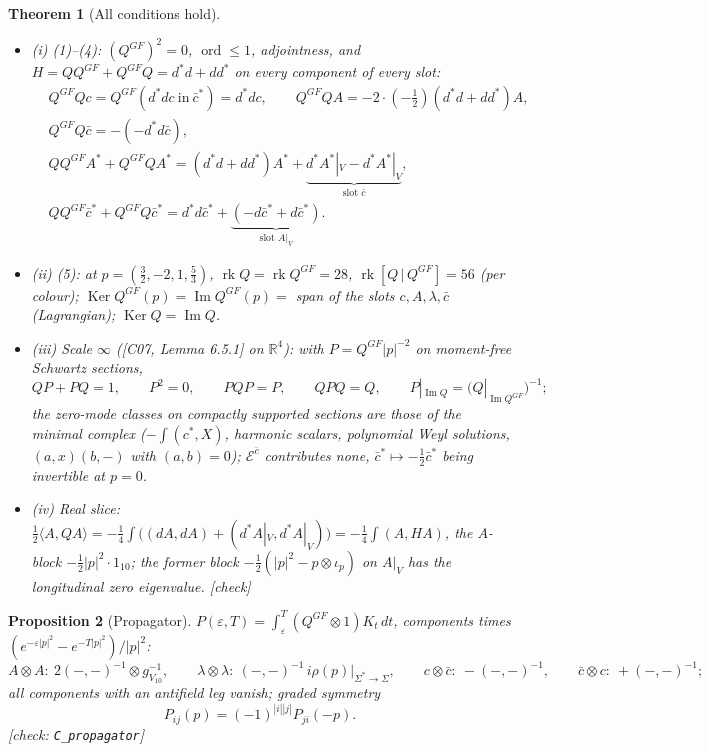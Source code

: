 \documentclass[11pt]{article}
\theoremstyle{plain}
\newtheorem{theorem}{Theorem}[section]
\newtheorem{proposition}[theorem]{Proposition}
\theoremstyle{definition}
\numberwithin{equation}{section}
\begin{document}
\begin{theorem}[All conditions hold]
\label{thm:axA}
\begin{itemize}
\item (i) (1)--(4): $(Q^{GF})^2=0$, $\operatorname{ord}\le1$, adjointness, and $H=QQ^{GF}+Q^{GF}Q=d^*d+dd^*$ on every component of every slot:
\[
\begin{aligned}
&Q^{GF}Qc=Q^{GF}(d^*dc\ \text{in}\ \bar c^*)=d^*dc,\qquad Q^{GF}QA=-2\cdot(-\tfrac12)(d^*d+dd^*)A,\\
&Q^{GF}Q\bar c=-(-d^*d\bar c),\\
&QQ^{GF}A^*+Q^{GF}QA^*=(d^*d+dd^*)A^*+\underbrace{d^*A^*|_V-d^*A^*|_V}_{\text{slot }\bar c},\\
&QQ^{GF}\bar c^*+Q^{GF}Q\bar c^*=d^*d\bar c^*+\underbrace{(-d\bar c^*+d\bar c^*)}_{\text{slot }A|_V}.
\end{aligned}
\]
\item (ii) (5): at $p=(\tfrac32,-2,1,\tfrac53)$, $\operatorname{rk}Q=\operatorname{rk}Q^{GF}=28$, $\operatorname{rk}[Q\,|\,Q^{GF}]=56$ (per colour); $\operatorname{Ker}Q^{GF}(p)=\operatorname{Im}Q^{GF}(p)=$ span of the slots $c,A,\lambda,\bar c$ (Lagrangian); $\operatorname{Ker}Q=\operatorname{Im}Q$.
\item (iii) Scale $\infty$ ([C07, Lemma 6.5.1] on $\mathbb R^4$): with $P=Q^{GF}|p|^{-2}$ on moment-free Schwartz sections,
\[
QP+PQ=1,\qquad P^2=0,\qquad PQP=P,\qquad QPQ=Q,\qquad P|_{\operatorname{Im}Q}=\big(Q|_{\operatorname{Im}Q^{GF}}\big)^{-1};
\]
the zero-mode classes on compactly supported sections are those of the minimal complex ($-\int(c^*,X)$, harmonic scalars, polynomial Weyl solutions, $(a,x)(b,-)$ with $(a,b)=0$); $\mathscr E^{\bar c}$ contributes none, $\bar c^*\mapsto-\tfrac12\bar c^*$ being invertible at $p=0$.
\item (iv) Real slice: $\tfrac12\langle A,QA\rangle=-\tfrac14\int\big((dA,dA)+(d^*A|_V,d^*A|_V)\big)=-\tfrac14\int(A,HA)$, the $A$-block $-\tfrac12|p|^2\cdot1_{10}$; the former block $-\tfrac12(|p|^2-p\otimes\iota_p)$ on $A|_V$ has the longitudinal zero eigenvalue. [check]
\end{itemize}
\end{theorem}

\begin{proposition}[Propagator]
\label{prop:propA}
$P(\varepsilon,T)=\int_\varepsilon^T(Q^{GF}\otimes1)K_t\,dt$, components times $(e^{-\varepsilon|p|^2}-e^{-T|p|^2})/|p|^2$:
\[
A\otimes A:\ 2(-,-)^{-1}\otimes g^{-1}_{V_{10}},\qquad \lambda\otimes\lambda:\ (-,-)^{-1}\,i\rho(p)|_{\Sigma^*\to\Sigma},\qquad c\otimes\bar c:\ -(-,-)^{-1},\qquad \bar c\otimes c:\ +(-,-)^{-1};
\]
all components with an antifield leg vanish; graded symmetry
\[
P_{ij}(p)=(-1)^{|i||j|}P_{ji}(-p).
\] [check: \texttt{C\_propagator}]
\end{proposition}
\end{document}
